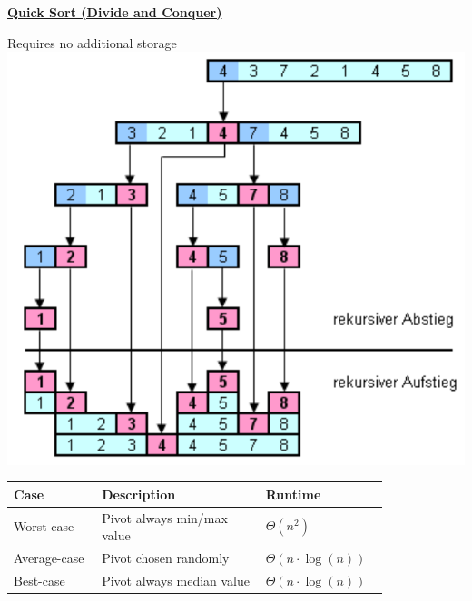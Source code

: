     {\centering\underline{\textbf{Quick Sort (Divide and Conquer)}} \par}
        Requires no additional storage\\
        \includegraphics[width = \linewidth]{src/3_containers/images/quicksort.png}
          
        
        \begin{tabular*}{\linewidth}{| p{0.21\linewidth} | p{0.39\linewidth} | p{0.22\linewidth} |}
            \hline
            Case & Description & Runtime\\
            \hline \hline
            Worst-case & Pivot always min/max value & $\Theta(n^2)$ \\
            \hline
            Average-case & Pivot chosen randomly & $\Theta(n \cdot \log(n))$ \\
            \hline
            Best-case & Pivot always median value & $\Theta(n \cdot \log(n))$ \\
            \hline
        \end{tabular*}

